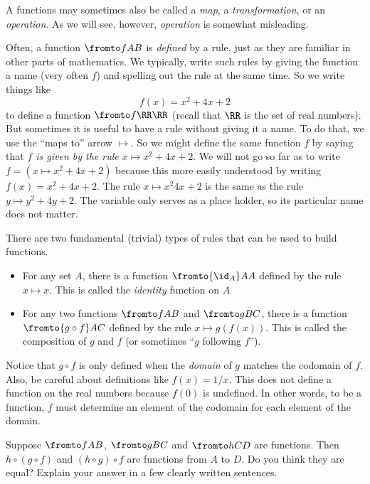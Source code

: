 A functions may sometimes also be called a \emph{map}, a \emph{transformation}, or an \emph{operation}. 
As we will see, however, \emph{operation} is somewhat misleading. 

Often, a function $\fromto fAB$ is \emph{defined} by a rule, just as they are familiar in other parts of mathematics. 
We typically, write such rules by giving the function a name (very often $f$) and spelling out the rule at the same time.
So we write things like
\[f(x)=x^2 + 4x + 2\]
to define a function $\fromto f\RR\RR$ (recall that $\RR$ is the set of real numbers).
But sometimes it is useful to have a rule without giving it a name.
To do that, we use the ``maps to'' arrow $\mapsto$.
So we might define the same function $f$ by saying that \emph{$f$ is given by the rule $x\mapsto x^2 + 4x + 2$}. 
We will not go so far as to write $f = (x\mapsto x^2+4x+2)$ because this more easily understood by writing $f(x)=x^2+4x+2$.
The rule $x\mapsto x^2  4x + 2$ is the same as the rule $y\mapsto y^2 + 4y + 2$. 
The variable only serves as a place holder, so its particular name does not matter.

There are two fundamental (trivial) types of rules that can be used to build functions.

\begin{axiom}
	\begin{itemize}
		\item For any set $A$, there is a function $\fromto {\id_A}AA$ defined by the rule $x\mapsto x$.
		This is called the \emph{identity} function on $A$
		\item For any two functions $\fromto fAB$ and $\fromto gBC$, there is a function $\fromto {g\circ f}AC$ defined by the rule $x\mapsto g(f(x))$.
		This is called the composition of $g$ and $f$ (or sometimes ``$g$ following $f$'').
	\end{itemize}
\end{axiom}

Notice that $g\circ f$ is only defined when the \emph{domain} of $g$ matches the codomain of $f$.
Also, be careful about definitions like $f(x)=1/x$.
This does not define a function on the real numbers because $f(0)$ is undefined.
In other words, to be a function, $f$ must determine an element of the codomain for each element of the domain.

\begin{exercises}
Suppose $\fromto fAB$, $\fromto gBC$ and $\fromto hCD$ are functions. Then $h\circ(g\circ f)$ and $(h\circ g)\circ f$ are functions
from $A$ to $D$. Do you think they are equal? Explain your answer in a few clearly written sentences.	
\end{exercises}

